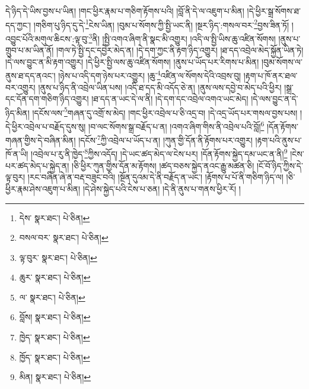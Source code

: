 དེ་ཉིད་དེ་ཡིས་བྱས་པ་ཡིན། །གང་ཕྱིར་རྣམ་པ་གཅིག་རྟོགས་པའི། །བློ་ནི་དེ་ལ་འཇུག་པ་མིན། །དེ་ཕྱིར་སྒྲ་སོགས་ཐ་དད་ཀྱང་། །གཅིག་པུ་ཉིད་དུ་དེ་\footnote{དེས་  སྣར་ཐང་།  པེ་ཅིན། }ངེས་ཡིན། །བུམ་པ་སོགས་ཀྱི་སྤྱི་ཡང་ནི། །སྔར་ཉིད་:གསལ་བར་\footnote{བསལ་བར་  སྣར་ཐང་།  པེ་ཅིན། }བྱས་ཟིན་ཏོ། །འབྱུང་པོའི་མགུལ་ཆིངས་:ལྟ་བུ་\footnote{ལྟ་བུར་  སྣར་ཐང་།  པེ་ཅིན། }ནི། །སྤྱི་འགའ་ཞིག་ནི་སྣང་མི་འགྱུར། །འདི་ལ་སྤྱི་ཡིས་ཆུ་འཛིན་སོགས། །ནུས་པ་གྲུབ་པ་མ་ཡིན་ནོ། །གལ་ཏེ་སྤྱི་དང་དབྱེར་མེད་ན། །དེ་དག་ཀྱང་ནི་རྟག་ཉིད་འགྱུར། །ཐ་དད་འབྲེལ་མེད་སྐྱོན་ཡིན་ཏེ། །དེ་ལས་བྱུང་ན་མི་རྟག་འགྱུར། །དེ་ཕྱིར་སྤྱི་ལས་ཆུ་འཛིན་སོགས། །ནུས་པ་ཡོད་པར་རིགས་པ་མིན། །བུམ་སོགས་ལ་ནུས་ཐ་དད་ནའང་། །ཉེས་པ་འདི་དག་ཉེས་པར་འགྱུར། །ཆུ་\footnote{ཆུར་  སྣར་ཐང་།  པེ་ཅིན། }འཛིན་ལ་སོགས་དེའི་འབྲས་བུ། །རྟག་པ་ཁོ་ནར་ཐལ་བར་འགྱུར། །ནུས་པ་ཉིད་ནི་འབྲེལ་ཡིན་པས། །འདི་ཐ་དད་མི་འདོད་ཅེ་ན། །ནུས་ལས་དབྱེ་བ་མེད་པའི་ཕྱིར། །སྒྲ་དང་དོན་དག་གཅིག་ཉིད་འགྱུར། །ཐ་དད་ན་ཡང་དེ་ལ་ནི། །དེ་དག་དང་འབྲེལ་འགའ་ཡང་མེད། །དེ་ལས་བྱུང་ན་དེ་ཉིད་མིན། །དངོས་ལས་\footnote{ལ་  སྣར་ཐང་།  པེ་ཅིན། }གཞན་དུ་འགྲོ་ས་མེད། །གང་ཕྱིར་འབྲེལ་པ་ཅི་འདྲ་བ། །དེ་འདྲ་ཡོད་པར་གསལ་བྱས་པས། །དེ་ཕྱིར་འབྲེལ་པ་བརྗོད་དུས་སུ། །བ་ལང་སོགས་སྒྲ་བརྗོད་པ་ན། །འགའ་ཞིག་གིས་ནི་འབྲེལ་པའི་བློ།\footnote{བློས།  སྣར་ཐང་།  པེ་ཅིན། } །དོན་རྟོགས་གཞན་གྱིས་དེ་བཞིན་མིན། །དངོས་\footnote{ཁྱེད་  སྣར་ཐང་།  པེ་ཅིན། }ཀྱི་འབྲེལ་པ་ཡོད་པ་ན། །ཀུན་གྱི་དོན་ནི་རྟོགས་པར་འགྱུར། །རྟག་པའི་ནུས་པ་ཁོ་ན་ཡི། །འབྲེལ་པ་རུ་ནི་ཁྱེད་\footnote{ཁྱོད་  སྣར་ཐང་།  པེ་ཅིན། }ཀྱིས་འདོད། །དེ་ཡང་ཚད་མེད་ལ་ངེས་པར། །དོན་རྟོགས་སྐྱེད་དམ་ཡང་ན་ནི།\footnote{མིན།  སྣར་ཐང་།  པེ་ཅིན། } །ངེས་པར་ཚད་མེད་པ་སྐྱེད་ན། །ཅི་ཕྱིར་ཀུན་གྱིས་དོན་མ་རྟོགས། །ཚད་བཅས་སྐྱེད་ནའང་རྒྱུ་མཚན་ཅི། །ངོ་བོ་ཉིད་ཀྱིས་དེ་ལྟ་བུར། །རང་བཞིན་ཞེ་ན་བརྡ་བཟུང་བའི། །སྔོན་དུའམ་དེ་ནི་བརྗོད་ན་ཡང་། །རྟོགས་པ་པོ་ནི་གཅིག་ཉིད་ལ། །ཅི་ཕྱིར་རྣམ་ཤེས་འཇུག་པ་མིན། །དེ་ཤེས་སྐྱེད་པའི་ངེས་པ་ཅན། །དེ་ནི་ནུས་པ་གནས་ཕྱིར་རོ། །
